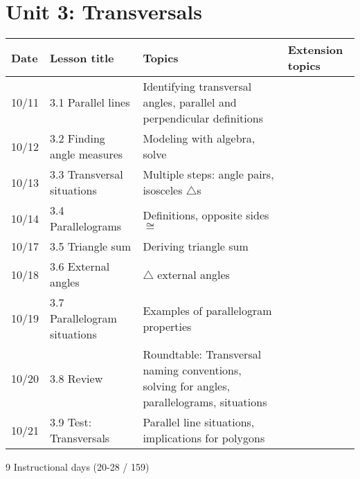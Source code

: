 \section*{Unit 3: Transversals}
\begin{tabular}{|p{0.9cm}|p{4cm}|p{7cm}|p{5cm}|}
  \hline
  Date & Lesson title & Topics  & Extension topics \\
  \hline
  10/11 & 3.1 Parallel lines & Identifying transversal angles, parallel and perpendicular definitions &  \\
  \hline
  10/12 & 3.2 Finding angle measures & Modeling with algebra, solve &  \\
  \hline
  10/13 & 3.3 Transversal situations & Multiple steps: angle pairs, isosceles $\triangle$s &  \\
  \hline
  10/14 & 3.4 Parallelograms & Definitions, opposite sides $\cong$ &  \\
  \hline
  10/17 & 3.5 Triangle sum & Deriving triangle sum &  \\
  \hline
  10/18 & 3.6 External angles & $\triangle$ external angles & \\
  \hline
  10/19 & 3.7 Parallelogram situations & Examples of parallelogram properties &  \\
  \hline
  10/20 & 3.8 Review & Roundtable: Transversal naming conventions, solving for angles, parallelograms, situations & \\
  \hline
  10/21 & 3.9 Test: Transversals & Parallel line situations, implications for polygons &  \\
  \hline

\end{tabular} \par \vspace*{0.3cm}
9 Instructional days (20-28 / 159)


\newpage


